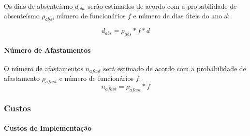 \documentclass[]{article}
\let\oldparagraph\paragraph
\renewcommand{\paragraph}[1]{\oldparagraph{#1}\mbox{}}
\begin{document}
Os dias de absenteísmo \(d_{abs}\) serão estimados de acordo com a
probabilidade de absenteísmo \(\rho_{abs}\), número de funcionários
\(f\) e número de dias úteis do ano \(d\):

\[d_{abs} = \rho_{abs} * f * d\]

\paragraph{Número de Afastamentos}\label{numero-de-afastamentos}

O número de afastamentos \(n_{afast}\) será estimado de acordo com a
probabilidade de afastamento \(\rho_{afast}\) e número de funcionários
\(f\): \[n_{afast} = \rho_{afast} * f \]

\subsubsection{Custos}\label{custos}

\paragraph{Custos de Implementação}\label{custos-de-implementacao}
\end{document}
